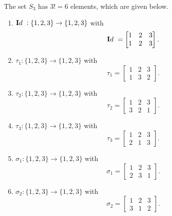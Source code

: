 \begin{exa}
The set $S_3$ has  $3! = 6$ elements, which are given below.
\begin{enumerate}
\item ${\mathbf Id\ }: \{1, 2, 3\} \rightarrow \{1, 2, 3\}$ with
$${\mathbf Id\ }  = \begin{bmatrix} 1 & 2 & 3 \\  1 & 2 & 3 \end{bmatrix}.$$
\item $\tau_1: \{1, 2, 3\} \rightarrow \{1, 2, 3\} $ with
$$\tau_1  = \begin{bmatrix}1 & 2 & 3 \\  1 & 3 & 2 \end{bmatrix}.$$

\item $\tau_2: \{1, 2, 3\}  \rightarrow \{1, 2, 3\} $ with
$$\tau_2  = \begin{bmatrix} 1 & 2 & 3 \\ 3 & 2 & 1 \end{bmatrix}.$$
\item $\tau_3: \{1, 2, 3\}  \rightarrow \{1, 2, 3\} $ with
$$\tau_3  = \begin{bmatrix} 1 & 2 & 3 \\ 2 & 1 & 3 \end{bmatrix}.$$

\item $\sigma_1: \{1, 2, 3\}  \rightarrow \{1, 2, 3\} $ with
$$\sigma_1  = \begin{bmatrix} 1 & 2 & 3 \\ 2 & 3 & 1 \end{bmatrix}.$$

\item $\sigma_2: \{1, 2, 3\} \rightarrow \{1, 2, 3\} $ with
$$\sigma_2  = \begin{bmatrix} 1 & 2 & 3 \\ 3 & 1 & 2 \end{bmatrix}.$$

\end{enumerate}
\label{ex:S_3}\end{exa}

